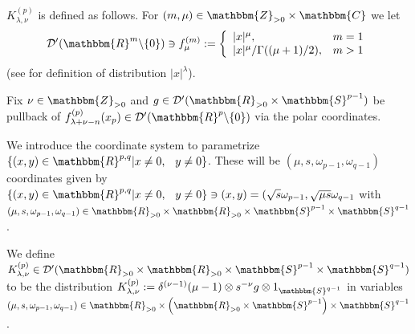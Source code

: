 \documentclass{article}
\newcommand{\assign}{:=}
\numberwithin{definition}{section}
\numberwithin{lemma}{section}
\numberwithin{proposition}{section}
{\theorembodyfont{\rmfamily}\newtheorem{remark}{Remark}
\numberwithin{remark}{section}
}
\newcommand{\D}{\mathcal{D}} \newcommand{\supp}{supp}
\newcommand{\Sp}{{\mathbbm{S}}} \newcommand{\R}{{\mathbbm{R}}}
\begin{document}
\begin{remark}
  $K^{( p)}_{\lambda, \nu}$ is defined as follows. For $( m, \mu) \in
  \mathbbm{Z}_{> 0} \times \mathbbm{C}$ we let
  \[ \mathcal{D}' ( \mathbbm{R}^m \backslash \{ 0 \}) \ni f_{\mu}^{( m)}
     \assign \left\{ \begin{array}{ll}
       | x |^{\mu}, & m = 1\\
       | x |^{\mu} / \Gamma ( ( \mu + 1) / 2), & m > 1
     \end{array} \right. \]
  (see {\cite[ch. III, sec. 3.2, 3.3]{gelfand1980distribution}} for definition
  of distribution $| x |^{\lambda}$).
  
  Fix $\nu \in \mathbbm{Z}_{> 0}$ and $g \in \D' ( \R_{> 0} \times \Sp^{p -
  1})$ be pullback of $f^{( p)}_{\lambda + \nu - n} ( x_p) \in \mathcal{D}' (
  \mathbbm{R}^p \backslash \{ 0 \})$ via the polar coordinates.
  
  We introduce the coordinate system to parametrize $\{(x, y) \in \R^{p, q} |x
  \neq 0, \hspace{0.75em} y \neq 0\}$. These will be $(\mu, s, \omega_{p - 1},
  \omega_{q - 1})$ coordinates given by $\{ (x, y) \in \R^{p, q} |x \neq 0,
  \hspace{0.75em} y \neq 0\} \ni (x, y) = ( \sqrt{s} \omega_{p - 1}, \sqrt{\mu
  s} \omega_{q - 1}$ with $(\mu, s, \omega_{p - 1}, \omega_{q - 1}) \in \R_{>
  0} \times \R_{> 0} \times \Sp^{p - 1} \times \Sp^{q - 1}$.
  
  We define $K^{( p)}_{\lambda, \nu} \in \D' ( \R_{> 0} \times \R_{> 0} \times
  \Sp^{p - 1} \times \Sp^{q - 1})$ to be the distribution $K^{( p)}_{\lambda,
  \nu} \assign \delta^{(\nu - 1)}  (\mu - 1) \otimes s^{- \nu} g \otimes
  1_{\Sp^{q - 1}}$ in variables $(\mu, s, \omega_{p - 1}, \omega_{q - 1}) \in
  \R_{> 0} \times \left( \R_{> 0} \times \Sp^{p - 1} \right) \times \Sp^{q -
  1}$.
\end{remark}
\end{document}
